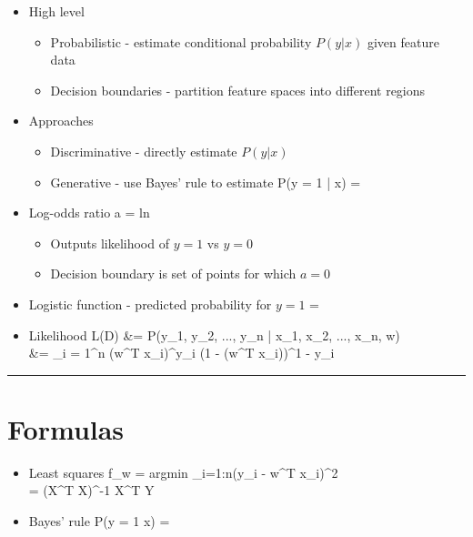 \documentclass[12pt]{article}
\newcommand{\divider}[0]{\par\textcolor{lightgray}{\rule{\textwidth}{0.1pt}}}
\newenvironment{eqn}{\equation\alignedat{3}}{\endalignedat\endequation}
\begin{document}
\begin{itemize}
	\item High level
	\begin{itemize}
		\item Probabilistic - estimate conditional probability $P(y | x)$ given feature data
		\item Decision boundaries - partition feature spaces into different regions
	\end{itemize}
	\item Approaches
	\begin{itemize}
		\item Discriminative - directly estimate $P(y | x)$
		\item Generative - use Bayes' rule to estimate
		\begin{eqn}
			P(y = 1 | x) = 
		\end{eqn}
	\end{itemize}
	\item Log-odds ratio
	\begin{eqn}
		a = ln 
	\end{eqn}
	\begin{itemize}
		\item Outputs likelihood of $y = 1$ vs $y = 0$
		\item Decision boundary is set of points for which $a = 0$
	\end{itemize}
	\item Logistic function - predicted probability for $y = 1$
	\begin{eqn}
		\sigma = 
	\end{eqn}
	\item Likelihood
	\begin{eqn}
		L(D) &= P(y_1, y_2, ..., y_n | x_1, x_2, ..., x_n, w) \\
		&= \prod_{i = 1}^n \sigma(w^T x_i)^{y_i} (1 - \sigma(w^T x_i))^{1 - y_i}
	\end{eqn}
\end{itemize}

\newpage

\divider

\section{Formulas}

\begin{itemize}
	\item Least squares 
	\begin{eqn}
		f_w = argmin \Sigma_{i=1:n}(y_i - w^T x_i)^2 \\
		 = (X^T X)^{-1} X^T Y
	\end{eqn}
	\item Bayes' rule 
	\begin{eqn}
		P(y = 1 \mid x) = 
	\end{eqn}
\end{itemize}
\end{document}
